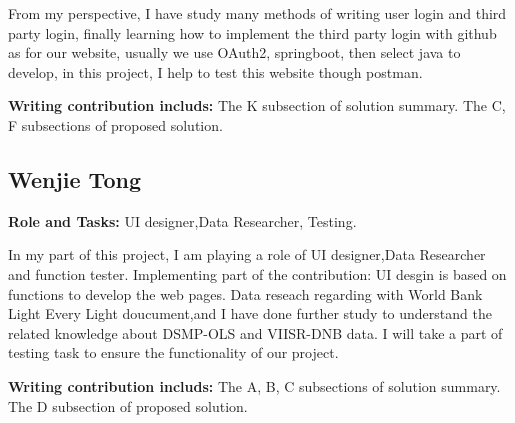 \documentclass[conference]{IEEEtran}
\begin{document}
From my perspective, I have study many methods of writing user login and third party login,
finally learning how to implement the third party login with github as for our website,
usually we use OAuth2, springboot, then select java to develop, in this project, I help to test
this website though postman.

\textbf{Writing contribution includs:} The K subsection of solution summary. The C, F subsections of proposed solution.

\subsection{Wenjie Tong} 
\textbf{Role and Tasks:} UI designer,Data Researcher, Testing.

    In my part of this project, I am playing a role of UI designer,Data Researcher and function 
    tester. 
    Implementing part of the contribution:
    UI desgin is based on functions to develop the web pages.
    Data reseach regarding with World Bank Light Every Light doucument,and I have done further 
    study to understand the related knowledge about DSMP-OLS and VIISR-DNB data.
    I will take a part of testing task to ensure the functionality of our project.

\textbf{Writing contribution includs:} The A, B, C subsections of solution summary. 
    The D subsection of proposed solution.
  
\printbibliography
\end{document}
